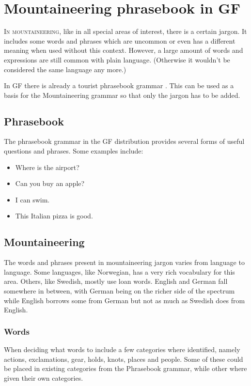 \chapter{Mountaineering phrasebook in GF}
\lettrine[lines=4, loversize=-0.1, lraise=0.1]{I}{n mountaineering}, like in all special areas of interest, there is a certain jargon. It includes some words and phrases which are uncommon or even has a different meaning when used without this context. However, a large amount of words and expressions are still common with plain language. (Otherwise it wouldn't be considered the same language any more.)

In GF there is already a tourist phrasebook grammar \cite{phrasebook}. This can be used as a basis for the Mountaineering grammar so that only the jargon has to be added.


\section{Phrasebook}
The phrasebook grammar in the GF distribution provides several forms of useful questions and phrases. Some examples include:
\begin{itemize}
\item Where is the airport?
\item Can you buy an apple?
\item I can swim.
\item This Italian pizza is good.
\end{itemize}


\section{Mountaineering}
The words and phrases present in mountaineering jargon varies from language to language. Some languages, like Norwegian, has a very rich vocabulary for this area. Others, like Swedish, mostly use loan words. English and German fall somewhere in between, with German being on the richer side of the spectrum while English borrows some from German but not as much as Swedish does from English. \cite{loanwords}


\subsection{Words}
\label{sec:words}
When deciding what words to include a few categories where identified, namely actions, exclamations, gear, holds, knots, places and people. Some of these could be placed in existing categories from the Phrasebook grammar, while other where given their own categories.

